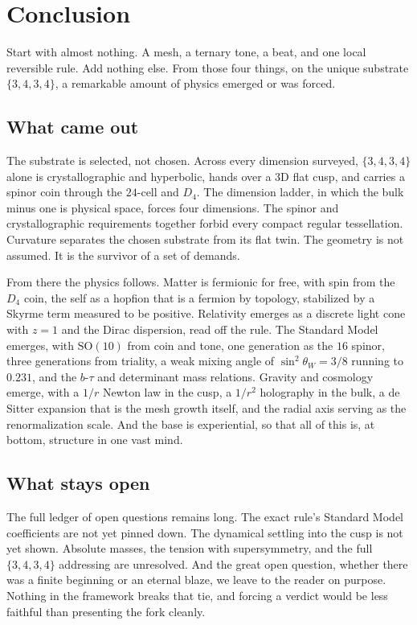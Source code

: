 \section{Conclusion}

Start with almost nothing. A mesh, a ternary tone, a beat, and one local reversible rule. Add nothing else. From
those four things, on the unique substrate $\{3,4,3,4\}$, a remarkable amount of physics emerged or was forced.

\subsection{What came out}

The substrate is selected, not chosen. Across every dimension surveyed, $\{3,4,3,4\}$ alone is crystallographic
and hyperbolic, hands over a $3$D flat cusp, and carries a spinor coin through the $24$-cell and $D_4$. The
dimension ladder, in which the bulk minus one is physical space, forces four dimensions. The spinor and
crystallographic requirements together forbid every compact regular tessellation. Curvature separates the chosen
substrate from its flat twin. The geometry is not assumed. It is the survivor of a set of demands.

From there the physics follows. Matter is fermionic for free, with spin from the $D_4$ coin, the self as a hopfion
that is a fermion by topology, stabilized by a Skyrme term measured to be positive. Relativity emerges as a
discrete light cone with $z = 1$ and the Dirac dispersion, read off the rule. The Standard Model emerges, with
$\mathrm{SO}(10)$ from coin and tone, one generation as the $16$ spinor, three generations from triality, a weak
mixing angle of $\sin^2\theta_W = 3/8$ running to $0.231$, and the $b$-$\tau$ and determinant mass relations.
Gravity and cosmology emerge, with a $1/r$ Newton law in the cusp, a $1/r^2$ holography in the bulk, a de Sitter
expansion that is the mesh growth itself, and the radial axis serving as the renormalization scale. And the base
is experiential, so that all of this is, at bottom, structure in one vast mind.

\subsection{What stays open}

The full ledger of open questions remains long. The exact rule's Standard Model coefficients are not yet pinned
down. The dynamical settling into the cusp is not yet shown. Absolute masses, the tension with supersymmetry, and
the full $\{3,4,3,4\}$ addressing are unresolved. And the great open question, whether there was a finite
beginning or an eternal blaze, we leave to the reader on purpose. Nothing in the framework breaks that tie, and
forcing a verdict would be less faithful than presenting the fork cleanly.

